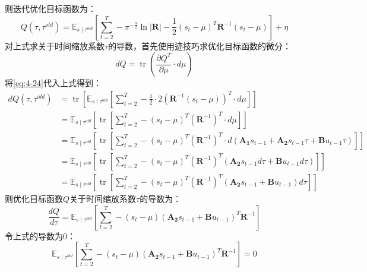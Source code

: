 则迭代优化目标函数为：
\begin{equation}
    Q\left(\tau, \tau^{old}\right)
    =\mathbb{E}_{s \mid \tau^{old}}\left[\sum_{t=2}^T-\pi^{-\frac{n}{2}}\ln\mathbf{|R|}-\frac{1}{2}\left(s_t-\mu\right)^T \mathbf{R}^{-1}\left(s_t-\mu\right)\right] + \eta
    \label{eq:4-24}
\end{equation}
对上式求关于时间缩放系数$\tau$的导数，首先使用迹技巧求优化目标函数的微分：
\begin{equation}
    d Q=\operatorname{tr}\left(\frac{\partial Q^T}{\partial \mu} \cdot d \mu\right)
    \label{eq:4-25}
\end{equation}
将\ref{eq:4-24}代入上式得到：
\begin{equation}
    \begin{aligned}
    d Q\left(\tau, \tau^{old}\right)
    & =\operatorname{tr}\left[\mathbb{E}_{s \mid \tau^{old}}\left[\sum_{t=2}^T-\frac{1}{2} \cdot 2 \left(\mathbf{R}^{-1}\left(s_t-\mu\right)\right)^T \cdot d \mu\right]\right] \\
    & =\mathbb{E}_{s \mid \tau^{old}}\left[\operatorname{tr}\left[\sum_{t=2}^T-\left(s_t-\mu\right)^T \left(\mathbf{R}^{-1}\right)^T \cdot d \mu\right]\right] \\
    & =\mathbb{E}_{s \mid \tau^{old}}\left[\operatorname{tr}\left[\sum_{t=2}^T-\left(s_t-\mu\right)^T \left(\mathbf{R}^{-1}\right)^T \cdot d\left(\mathbf{A_1} s_{t-1}+\mathbf{A_2} s_{t-1} \tau+\mathbf{B} u_{t-1} \tau\right)\right]\right] \\
    & =\mathbb{E}_{s \mid \tau^{old}}\left[\operatorname{tr}\left[\sum_{t=2}^T-\left(s_t-\mu\right)^T \left(\mathbf{R}^{-1}\right)^T\left(\mathbf{A_2}s_{t-1} d \tau+\mathbf{B} u_{t-1} d \tau\right)\right]\right] \\
    & =\mathbb{E}_{s \mid \tau^{old}}\left[\operatorname{tr}\left[\sum_{t=2}^T-\left(s_t-\mu\right)^T \left(\mathbf{R}^{-1}\right)^T(\mathbf{A_2} s_{t-1}+\mathbf{B} u_{t-1}) d \tau \right]\right]
    \end{aligned}
    \label{eq:4-26}
\end{equation}
则优化目标函数$Q$关于时间缩放系数$\tau$的导数为：
\begin{equation}
    \frac{d Q}{d \tau}=\mathbb{E}_{s \mid \tau^{old}}\left[\sum_{t=2}^T -\left(s_t-\mu\right)\left(\mathbf{A_2} s_{t-1}+\mathbf{B} u_{t-1}\right)^T\mathbf{R}^{-1}\right]
    \label{eq:4-27}
\end{equation}
令上式的导数为0：
\begin{equation}
    \mathbb{E}_{s \mid \tau^{old}}\left[\sum_{t=2}^T -\left(s_t-\mu\right)\left(\mathbf{A_2} s_{t-1}+\mathbf{B} u_{t-1}\right)^T\mathbf{R}^{-1}\right] = 0
    \label{eq:4-28}
\end{equation}
